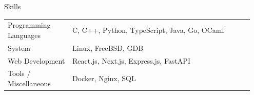 \documentclass{resume}
\begin{document}
\begin{rSection}{Skills}
	\begin{tabular}{@{}p{0.25\linewidth}p{0.7\linewidth}}
		Programming Languages
		 & C, C++, Python, TypeScript, Java, Go, OCaml		\\ [0.3em]

		System
		 & Linux, FreeBSD, GDB                  				\\ [0.3em]

		Web Development
		 & React.js, Next.js, Express.js, FastAPI 			\\ [0.3em]

		Tools / Miscellaneous
		 & Docker, Nginx, SQL                    				\\ [0.3em]
	\end{tabular}
\end{rSection}
\end{document}
